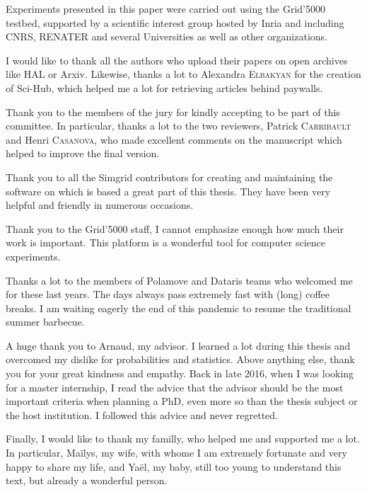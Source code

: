 

Experiments presented in this paper were carried out using the \mbox{Grid'5000}
testbed, supported by a scientific interest group hosted by \mbox{Inria} and including
\mbox{CNRS}, \mbox{RENATER} and several Universities as well as other organizations.

I would like to thank all the authors who upload their papers on open archives like HAL or Arxiv. Likewise, thanks a lot
to Alexandra \textsc{Elbakyan} for the creation of Sci-Hub, which helped me a lot for retrieving articles behind
paywalls.

Thank you to the members of the jury for kindly accepting to be part of this committee. In particular, thanks a lot to
the two reviewers, Patrick \textsc{Carribault} and Henri \textsc{Casanova}, who made excellent comments on the
manuscript which helped to improve the final version.

Thank you to all the Simgrid contributors for creating and maintaining the software on which is based a great part of
this thesis. They have been very helpful and friendly in numerous occasions.

Thank you to the Grid'5000 staff, I cannot emphasize enough how much their work is important. This platform is a
wonderful tool for computer science experiments.

Thanks a lot to the members of Polamove and Dataris teams who welcomed me for these last years. The days always pass
extremely fast with (long) coffee breaks. I am waiting eagerly the end of this pandemic to resume the traditional summer
barbecue.

A huge thank you to Arnaud, my advisor. I learned a lot during this thesis and overcomed my dislike for probabilities
and statistics. Above anything else, thank you for your great kindness and empathy.  Back in late 2016, when I was
looking for a master internship, I read the advice that the advisor should be the most important criteria when planning
a PhD, even more so than the thesis subject or the host institution. I followed this advice and never regretted.

Finally, I would like to thank my familly, who helped me and supported me a lot. In particular, Maïlys, my wife, with
whome I am extremely fortunate and very happy to share my life, and Yaël, my baby, still too young to understand this
text, but already a wonderful person.
